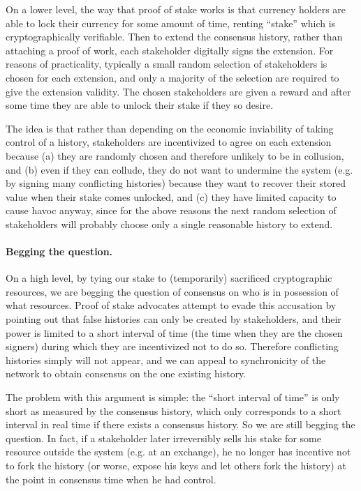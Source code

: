 \documentclass[letterpaper]{article}
\begin{document}
On a lower level, the way that proof of stake works is that currency holders are able
to lock their currency for some amount of time, renting ``stake'' which is cryptographically
verifiable. Then to extend the consensus history, rather than attaching a proof of work,
each stakeholder digitally signs the extension. For reasons of practicality, typically
a small random selection of stakeholders is chosen for each extension, and only a majority
of the selection are required to give the extension validity. The chosen stakeholders are
given a reward and after some time they are able to unlock their stake if they so desire.

The idea is that rather than depending on the economic inviability of taking control of
a history, stakeholders are incentivized to agree on each extension because (a) they are
randomly chosen and therefore unlikely to be in collusion, and (b) even if they can
collude, they do not want to undermine the system (e.g. by signing many conflicting
histories) because they want to recover their stored value when their stake comes unlocked,
and (c) they have limited capacity to cause havoc anyway, since for the above reasons the
next random selection of stakeholders will probably choose only a single reasonable
history to extend.

\paragraph{Begging the question.}
On a high level, by tying our stake to (temporarily) sacrificed cryptographic resources,
we are begging the question of consensus on who is in possession of what resources.
Proof of stake advocates attempt to evade this accusation by pointing out that false
histories can only be created by stakeholders, and their power is limited to a short
interval of time (the time when they are the chosen signers) during which they are incentivized
not to do so. Therefore conflicting histories simply will not appear, and we can appeal to
synchronicity of the network to obtain consensus on the one existing history.

The problem with this argument is simple: the ``short interval of time'' is only
short as measured by the consensus history, which only corresponds to a short interval
in real time if there exists a consensus history. So we are still begging the question.
In fact, if a stakeholder later irreversibly sells his stake for some resource outside
the system (e.g. at an exchange), he no longer has incentive not to fork the history
(or worse, expose his keys and let others fork the history) at the point in consensus
time when he had control.
\end{document}
